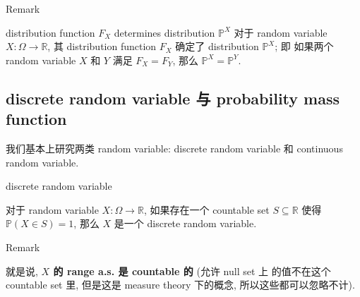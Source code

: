 \documentclass{qlnotes-export}
\begin{document}
\begin{qlremark}{Remark}
\begin{corollary}{distribution function \(F_{X}\) determines distribution
\({\mathbb{P}}^{X}\)}
对于 random variable \(X:\Omega\rightarrow{\mathbb{R}}\), 其 distribution function \(F_{X}\) 确定了 distribution \({\mathbb{P}}^{X}\); 即 如果两个 random variable \(X\) 和 \(Y\) 满足 \(F_{X} = F_{Y}\), 那么 \({\mathbb{P}}^{X} = {\mathbb{P}}^{Y}\).

\end{corollary}

\end{qlremark}

\subsection{discrete random variable 与 probability mass function}\label{discrete-random-variable-ux4e0e-probability-mass-function}

我们基本上研究两类 random variable: discrete random variable 和 continuous random variable.

\begin{definition}{discrete random variable}\label{def-02-random-variables-discrete-random-variable}

对于 random variable \(X:\Omega\rightarrow{\mathbb{R}}\), 如果存在一个 countable set \(S \subseteq {\mathbb{R}}\) 使得 \({\mathbb{P}}(X \in S) = 1\), 那么 \(X\) 是一个 discrete random variable.

\end{definition}

\begin{qlremark}{Remark}

就是说, \textbf{\(X\) 的 range a.s. 是 countable 的} (允许 null set 上 的值不在这个 countable set 里, 但是这是 measure theory 下的概念, 所以这些都可以忽略不计).

\end{qlremark}
\end{document}
